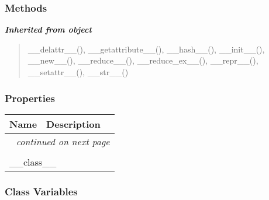   \subsubsection{Methods}


\large{\textbf{\textit{Inherited from object}}}

\begin{quote}
\_\_delattr\_\_(), \_\_getattribute\_\_(), \_\_hash\_\_(), \_\_init\_\_(), \_\_new\_\_(), \_\_reduce\_\_(), \_\_reduce\_ex\_\_(), \_\_repr\_\_(), \_\_setattr\_\_(), \_\_str\_\_()
\end{quote}


  \subsubsection{Properties}

    \vspace{-1cm}
\hspace{\varindent}\begin{longtable}{|p{\varnamewidth}|p{\vardescrwidth}|l}
\cline{1-2}
\cline{1-2} \centering \textbf{Name} & \centering \textbf{Description}& \\
\cline{1-2}
\endhead\cline{1-2}\multicolumn{3}{r}{\small\textit{continued on next page}}\\\endfoot\cline{1-2}
\endlastfoot\multicolumn{2}{|l|}{\textit{Inherited from object}}\\
\multicolumn{2}{|p{\varwidth}|}{\raggedright \_\_class\_\_}\\
\cline{1-2}
\end{longtable}



  \subsubsection{Class Variables}

